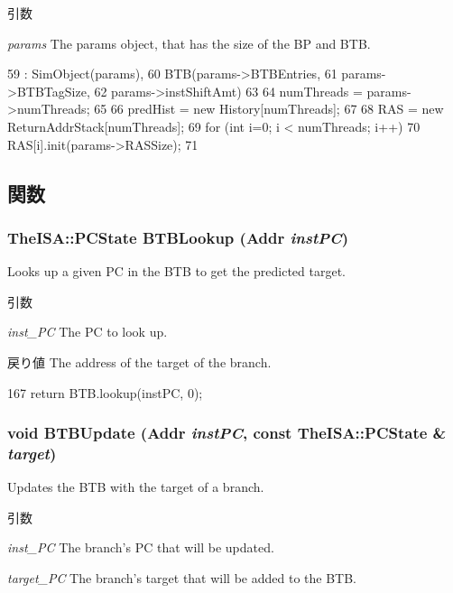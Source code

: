 \begin{DoxyParams}{引数}
\item[{\em params}]The params object, that has the size of the BP and BTB. \end{DoxyParams}



\begin{DoxyCode}
59     : SimObject(params),
60       BTB(params->BTBEntries,
61           params->BTBTagSize,
62           params->instShiftAmt)
63 {
64     numThreads = params->numThreads;
65 
66     predHist = new History[numThreads];
67 
68     RAS = new ReturnAddrStack[numThreads];
69     for (int i=0; i < numThreads; i++)
70         RAS[i].init(params->RASSize);
71 }
\end{DoxyCode}


\subsection{関数}
\hypertarget{classBPredUnit_a391197cbd3ef7a4dd06e561671f1347a}{
\subsubsection[{BTBLookup}]{\setlength{\rightskip}{0pt plus 5cm}TheISA::PCState BTBLookup ({\bf Addr} {\em instPC})}}
\label{classBPredUnit_a391197cbd3ef7a4dd06e561671f1347a}
Looks up a given PC in the BTB to get the predicted target. 
\begin{DoxyParams}{引数}
\item[{\em inst\_\-PC}]The PC to look up. \end{DoxyParams}
\begin{DoxyReturn}{戻り値}
The address of the target of the branch. 
\end{DoxyReturn}



\begin{DoxyCode}
167     { return BTB.lookup(instPC, 0); }
\end{DoxyCode}
\hypertarget{classBPredUnit_a9c9cad624af5c71140d7f402ee4f1a2c}{
\subsubsection[{BTBUpdate}]{\setlength{\rightskip}{0pt plus 5cm}void BTBUpdate ({\bf Addr} {\em instPC}, \/  const TheISA::PCState \& {\em target})}}
\label{classBPredUnit_a9c9cad624af5c71140d7f402ee4f1a2c}
Updates the BTB with the target of a branch. 
\begin{DoxyParams}{引数}
\item[{\em inst\_\-PC}]The branch's PC that will be updated. \item[{\em target\_\-PC}]The branch's target that will be added to the BTB. \end{DoxyParams}



